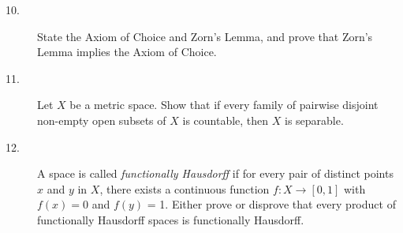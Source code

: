 \documentclass{article}
\begin{document}
\begin{description}
\item[10.]
State the Axiom of Choice and Zorn's Lemma, and prove that Zorn's Lemma
implies the Axiom of Choice.

\item[11.]
Let $X$ be a metric space. Show that if every family of pairwise disjoint
non-empty open subsets of $X$ is countable, then $X$ is separable.

\item[12.]
A space is called {\it functionally Hausdorff} if for every pair of distinct
points $x$ and $y$ in $X$, there exists a continuous function
$f : X \to [0,1]$ with $f(x) = 0$ and $f(y)$ = 1. Either prove or disprove
that every product of functionally Hausdorff spaces is functionally
Hausdorff.





\end{description}    
\end{document}
